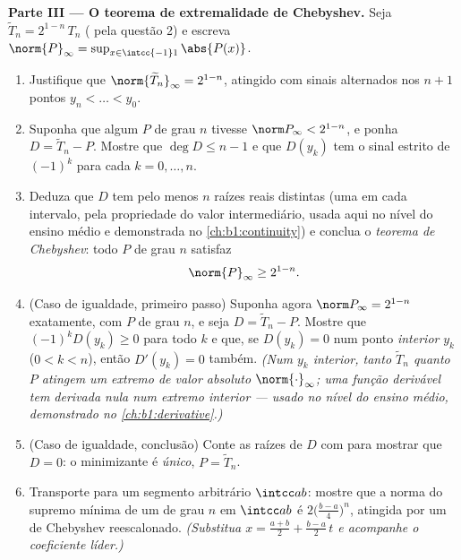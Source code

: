 \begin{problem}
\medskip
\noindent\textbf{Parte III --- O teorema de extremalidade de Chebyshev.}
Seja $\widetilde T_n = 2^{1-n}\,T_n$ ( pela questão 2) e
escreva $\norm{P}_\infty = \sup_{x \in \intcc{-1}1}\abs{P(x)}$.
\begin{enumerate}
  \item Justifique que $\norm{\widetilde T_n}_\infty = 2^{1-n}$, atingido
        com sinais alternados nos $n + 1$ pontos $y_n < \dots
        < y_0$.
  \item Suponha que algum $P$  de grau $n$ tivesse
        $\norm P_\infty < 2^{1-n}$, e ponha $D = \widetilde T_n -
        P$. Mostre que $\deg D \leq n - 1$ e que $D(y_k)$ tem o
        sinal estrito de $(-1)^k$ para cada $k = 0, \dots, n$.
  \item Deduza que $D$ tem pelo menos $n$ raízes reais distintas (uma
        em cada intervalo, pela propriedade do valor intermediário,
        usada aqui no nível do ensino médio e demonstrada no
        \cref{ch:b1:continuity}) e conclua o \emph{teorema de
        Chebyshev}: todo $P$  de grau $n$ satisfaz
        \[
        \norm{P}_\infty \geq 2^{1-n} .
        \]
  \item (Caso de igualdade, primeiro passo) Suponha agora $\norm P_\infty =
        2^{1-n}$ exatamente, com $P$  de grau $n$, e seja $D =
        \widetilde T_n - P$. Mostre que $(-1)^kD(y_k) \geq 0$ para
        todo $k$ e que, se $D(y_k) = 0$ num ponto \emph{interior}
        $y_k$ ($0 < k < n$), então $D'(y_k) = 0$ também.
        \emph{(Num $y_k$ interior, tanto $\widetilde T_n$ quanto
        $P$ atingem um extremo de valor absoluto $\norm{\cdot}
        _\infty$; uma função derivável tem derivada nula
        num extremo interior --- usado no nível do ensino médio,
        demonstrado no \cref{ch:b1:derivative}.)}
  \item (Caso de igualdade, conclusão) Conte as raízes de $D$ com
         para mostrar que $D = 0$: o minimizante é
        \emph{único}, $P = \widetilde T_n$.
  \item Transporte para um segmento arbitrário $\intcc ab$: mostre que
        a norma do supremo mínima de um  de grau $n$ em
        $\intcc ab$ é $2\bigl(\frac{b-a}4\bigr)^n$, atingida por um
         de Chebyshev reescalonado. \emph{(Substitua $x =
        \frac{a+b}2 + \frac{b-a}2\,t$ e acompanhe o coeficiente
        líder.)}
\end{enumerate}


\end{problem}
